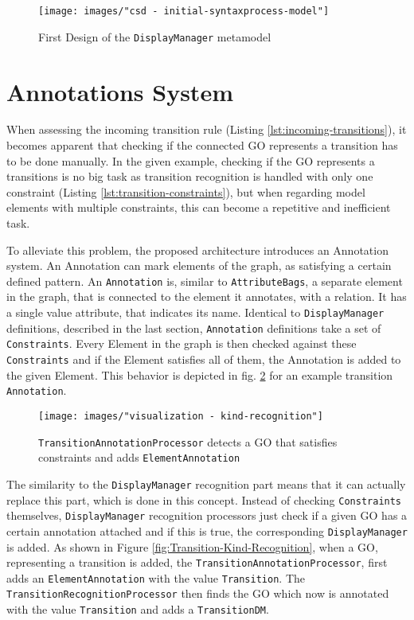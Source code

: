 \begin{figure}
\centering
\texttt{[image: images/"csd - initial-syntaxprocess-model"]}
\caption{First Design of the \texttt{DisplayManager} metamodel}
\label{fig:initial-syntax-model}
\end{figure}


\section{Annotations System}
When assessing the incoming transition rule (Listing \ref{lst:incoming-transitions}), it becomes apparent that checking if the connected GO represents a transition has to be done manually. In the given example, checking if the GO represents a transitions is no big task as transition recognition is handled with only one constraint (Listing \ref{lst:transition-constraints}), but when regarding model elements with multiple constraints, this can become a repetitive and inefficient task. 

To alleviate this problem, the proposed architecture introduces an Annotation system. An Annotation can mark elements of the graph, as satisfying a certain defined pattern. An \texttt{Annotation} is, similar to \texttt{AttributeBags}, a separate element in the graph, that is connected to the element it annotates, with a relation. It has a single value attribute, that indicates its name. Identical to \texttt{DisplayManager} definitions, described in the last section, \texttt{Annotation} definitions take a set of \texttt{Constraints}. Every Element in the graph is then checked against these \texttt{Constraints} and if the Element satisfies all of them, the Annotation is added to the given Element. This behavior is depicted in fig. \ref{fig:kind-recognition} for an example transition \texttt{Annotation}.

\begin{figure}
  \centering
  \texttt{[image: images/"visualization - kind-recognition"]}
  \caption{\texttt{TransitionAnnotationProcessor} detects a GO that satisfies constraints and adds \texttt{ElementAnnotation}}
  \label{fig:kind-recognition}
\end{figure}

The similarity to the \texttt{DisplayManager} recognition part means that it can actually replace this part, which is done in this concept. Instead of checking \texttt{Constraints} themselves, \texttt{DisplayManager} recognition processors just check if a given GO has a certain annotation attached and if this is true, the corresponding \texttt{DisplayManager} is added. As shown in Figure \ref{fig:Transition-Kind-Recognition}, when a GO, representing a transition is added, the \texttt{TransitionAnnotationProcessor}, first adds an \texttt{ElementAnnotation} with the value \texttt{Transition}. The \texttt{TransitionRecognitionProcessor} then finds the GO which now is annotated with the value \texttt{Transition} and adds a \texttt{TransitionDM}.


